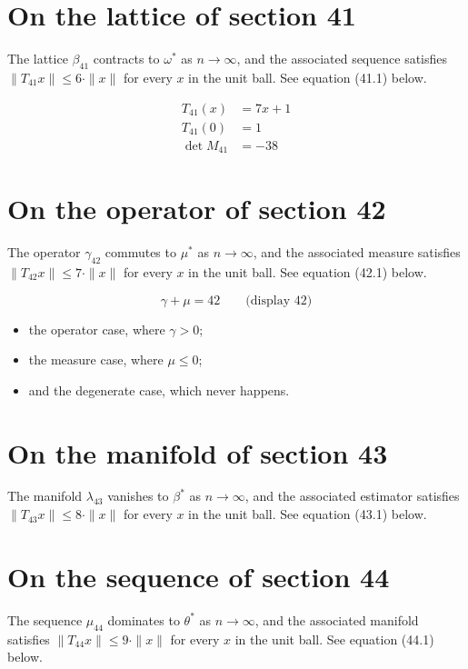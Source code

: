 \documentclass{article}
\begin{document}
\section{On the lattice of section 41}
The lattice $\beta_{41}$ contracts to $\omega^{*}$ as $n \to \infty$,
and the associated sequence satisfies $\|T_{41} x\| \leq 6 \cdot \|x\|$
for every $x$ in the unit ball. See equation (41.1) below.

\begin{align}
T_{41}(x) &= 7 x + 1 \\
T_{41}(0) &= 1 \\
\det M_{41} &= -38
\end{align}

\section{On the operator of section 42}
The operator $\gamma_{42}$ commutes to $\mu^{*}$ as $n \to \infty$,
and the associated measure satisfies $\|T_{42} x\| \leq 7 \cdot \|x\|$
for every $x$ in the unit ball. See equation (42.1) below.

$$
\gamma + \mu = 42 \qquad \text{(display 42)}
$$

\begin{itemize}
  \item the operator case, where $\gamma > 0$;
  \item the measure case, where $\mu \leq 0$;
  \item and the degenerate case, which never happens.
\end{itemize}

\section{On the manifold of section 43}
The manifold $\lambda_{43}$ vanishes to $\beta^{*}$ as $n \to \infty$,
and the associated estimator satisfies $\|T_{43} x\| \leq 8 \cdot \|x\|$
for every $x$ in the unit ball. See equation (43.1) below.

\section{On the sequence of section 44}
The sequence $\mu_{44}$ dominates to $\theta^{*}$ as $n \to \infty$,
and the associated manifold satisfies $\|T_{44} x\| \leq 9 \cdot \|x\|$
for every $x$ in the unit ball. See equation (44.1) below.
\end{document}
